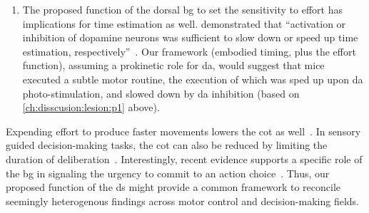 \begin{enumerate}[noitemsep, label=\Roman*.]
{    }
    \item The proposed function of the dorsal \gls{bg} to set the sensitivity to effort has implications for time estimation as well.
     demonstrated that ``activation or inhibition of dopamine neurons was sufficient to slow down or speed up time estimation, respectively''~\cite{Paton2016Sci}.
    Our framework (embodied timing, plus the effort function), assuming a prokinetic role for \gls{da}, would suggest that mice executed a subtle motor routine, the execution of which was sped up upon \gls{da} photo-stimulation, and slowed down by \gls{da} inhibition (based on \autoref{ch:disscusion:lesion:p1} above).\footnotemark
\end{enumerate}
\par
Expending effort to produce faster movements lowers the \gls{cot} as well~\cite{Shadmehr2019TINS}.
In sensory guided decision-making tasks, the \gls{cot} can also be reduced by limiting the duration of deliberation~\cite{Carland2019NeuroSci}.
Interestingly, recent evidence supports a specific role of the \gls{bg} in signaling the urgency to commit to an action choice~\cite{Thura2017Neruon,Carland2019NeuroSci}.
Thus, our proposed function of the \gls{ds} might provide a common framework to reconcile seemingly heterogenous findings across motor control and decision-making fields.